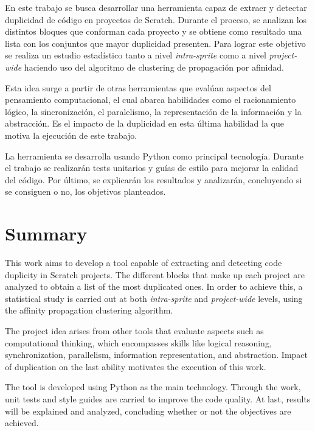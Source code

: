 \documentclass[a4paper, 12pt]{book}
\begin{document}
En este trabajo se busca desarrollar una herramienta capaz de extraer y detectar duplicidad de código en proyectos de Scratch. Durante el proceso, se analizan los distintos bloques que conforman cada proyecto y se obtiene como resultado una lista con los conjuntos que mayor duplicidad presenten. Para lograr este objetivo se realiza un estudio estadístico tanto a nivel \textit{intra-sprite} como a nivel \textit{project-wide} haciendo uso del algoritmo de clustering de propagación por afinidad.

Esta idea surge a partir de otras herramientas que evalúan aspectos del pensamiento computacional, el cual abarca habilidades como el racionamiento lógico, la sincronización, el paralelismo, la representación de la información y la abstracción. Es el impacto de la duplicidad en esta última habilidad la que motiva la ejecución de este trabajo.

La herramienta se desarrolla usando Python como principal tecnología. Durante el trabajo se realizarán tests unitarios y guías de estilo para mejorar la calidad del código. Por último, se explicarán los resultados y analizarán, concluyendo si se consiguen o no, los objetivos planteados.



\chapter*{Summary}

This work aims to develop a tool capable of extracting and detecting code duplicity in Scratch projects. The different blocks that make up each project are analyzed to obtain a list of the most duplicated ones. In order to achieve this, a statistical study is carried out at both \textit{intra-sprite} and \textit{project-wide} levels, using the affinity propagation clustering algorithm.

The project idea arises from other tools that evaluate aspects such as computational thinking, which encompasses skills like logical reasoning, synchronization, parallelism, information representation, and abstraction. Impact of duplication on the last ability motivates the execution of this work.

The tool is developed using Python as the main technology. Through the work, unit tests and style guides are carried to improve the code quality. At last, results will be explained and analyzed, concluding whether or not the objectives are achieved.
\end{document}
